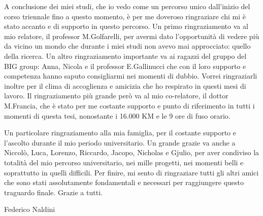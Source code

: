 A conclusione dei miei studi, che io vedo come un percorso unico dall'inizio del corso triennale fino a questo momento, è per me doveroso ringraziare chi mi è stato accanto e di supporto in questo percorso.
Un primo ringraziamento va al mio relatore, il professor M.Golfarelli, per avermi dato l'opportunità di vedere più da vicino un mondo che durante i miei studi non avevo mai approcciato: quello della ricerca.
Un altro ringraziamento importante va ai ragazzi del gruppo del BIG group: Anna, Nicola e il professor E.Gallinucci che con il loro supporto e competenza hanno saputo consigliarmi nei momenti di dubbio.
Vorrei ringraziarli inoltre per il clima di accoglienza e amicizia che ho respirato in questi mesi di lavoro.
Il ringraziamento più grande però va al mio co-relatore, il dottor M.Francia, che è stato per me costante supporto e punto di riferimento in tutti i momenti di questa tesi, nonostante i 16.000 KM e le 9 ore di fuso orario.

Un particolare ringraziamento alla mia famiglia, per il costante supporto e l'ascolto durante il mio periodo universitario.
Un grande grazie va anche a Niccolò, Luca, Lorenzo, Riccardo, Jacopo, Nicholas e Gjulio, per aver condiviso la totalità del mio percorso universitario, nei mille progetti, nei momenti belli e soprattutto in quelli difficili.
Per finire, mi sento di ringraziare tutti gli altri amici che sono stati assolutamente fondamentali e necessari per raggiungere questo traguardo finale.
Grazie a tutti.

\begin{flushright}
Federico Naldini
\end{flushright}